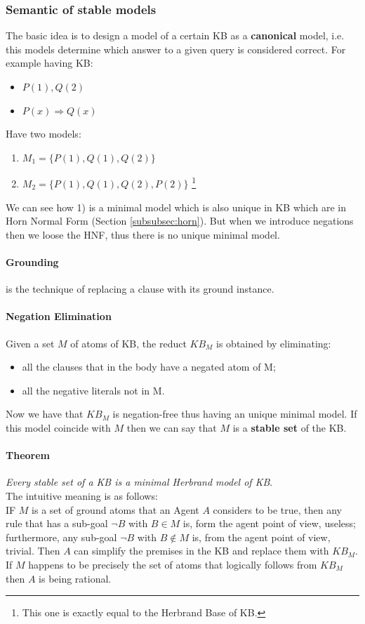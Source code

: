 \documentclass[10pt,a4paper]{article}
\begin{document}
\begin{itemize}
\subsubsection{Semantic of stable models}
The basic idea is to design a model of a certain KB as a \textbf{canonical} model, i.e. this models determine which answer to a given query is considered correct. For example having KB:
\begin{itemize}
\item $P(1),Q(2)$
\item $P(x) \Rightarrow Q(x)$
\end{itemize}
Have two models:
\begin{enumerate}
\item $M_1=\lbrace P(1), Q(1), Q(2) \rbrace$
\item $M_2=\lbrace P(1), Q(1), Q(2), P(2)\rbrace$ \footnote{This one is exactly equal to the Herbrand Base of KB.}
\end{enumerate}
We can see how 1) is a minimal model which is also unique in KB which are in Horn Normal Form (Section \ref{subsubsec:horn}). But when we introduce negations then we loose the HNF, thus there is no unique minimal model.\\

\paragraph{Grounding} is the technique of replacing a clause with its ground instance.

\paragraph{Negation Elimination} Given a set $M$ of atoms of KB, the reduct $KB_M$ is obtained by eliminating:
\begin{itemize}
\item all the clauses that in the body have a negated atom of M;
\item all the negative literals not in M.
\end{itemize}
Now we have that $KB_M$ is negation-free thus having an unique minimal model. If this model coincide with $M$ then we can say that $M$ is a \textbf{stable set} of the KB.\\

\paragraph{Theorem}
\textit{Every stable set of a KB is a minimal Herbrand model of KB}.\\
The intuitive meaning is as follows:\\
IF $M$ is a set of ground atoms that an Agent $A$ considers to be true, then any rule that has a sub-goal $\neg B$ with $B \in M$ is, form the agent point of view, useless; furthermore, any sub-goal $\neg B$ with $B \notin M$ is, from the agent point of view, trivial. Then $A$ can simplify the premises in the KB and replace them with $KB_M$. If $M$ happens to be precisely the set of atoms that logically follows from $KB_M$ then $A$ is being rational.\\


\end{itemize}
\end{document}
